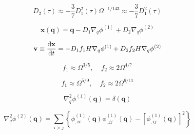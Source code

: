 \begin{equation}
	D_{2}(\tau) \approx -\frac{3}{7} D_{1}^{2}(\tau) \Omega^{-1/143} \approx -\frac{3}{7} D_{1}^{2}(\tau)
\end{equation}

\begin{equation}
	\mathbf{x}(\mathbf{q}) = \mathbf{q} - D_{1} \nabla_{q} \phi^{(1)} + D_{2} \nabla_{q} \phi^{(2)}
\end{equation}

\begin{equation}
	\mathbf{v} \equiv \frac{{\rm {d}} \mathbf{x}}{{\rm {d}} t} = - D_{1} f_{1} H \nabla_{q} \phi^{(1)} + D_{2} f_{2} H \nabla_{q} \phi^{(2)}
\end{equation}

\begin{equation}
	f_{1} \approx \Omega^{3/5}, \;\;\;\; f_{2} \approx 2 \Omega^{4/7}
\end{equation}

\begin{equation}
	f_{1} \approx \Omega^{5/9}, \;\;\;\; f_{2} \approx 2 \Omega^{6/11}
\end{equation}

\begin{equation}
	\nabla_{q}^{2} \phi^{(1)}(\mathbf{q}) = \delta(\mathbf{q})
\end{equation}

\begin{equation}
	\nabla_{q}^{2} \phi^{(2)}(\mathbf{q})
	= \sum_{i > j} \left\{ \phi_{,ii}^{(1)}(\mathbf{q}) \phi_{,jj}^{(1)}(\mathbf{q}) - \left[ \phi_{,ij}^{(1)}(\mathbf{q}) \right]^{2} \right\}
\end{equation}




